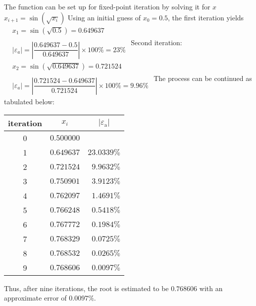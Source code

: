 \documentclass[../main.tex]{subfiles}
\begin{document}
\chapter{}
\label{cha:cha_6}


\section{}


The function can be set up for fixed-point iteration by solving it for $x$
\bigbreak
$x_{i+1}=\sin \left(\sqrt{x_{i}}\right)$
\bigbreak
Using an initial guess of $x_{0}=0.5$, the first iteration yields
\bigbreak
$
\begin{aligned}
&x_{1}=\sin (\sqrt{0.5})=0.649637 \\\\
&\left|\varepsilon_{a}\right|=\left|\dfrac{0.649637-0.5}{0.649637}\right| \times 100 \%=23 \%
\end{aligned}
$
\bigbreak
Second iteration:
\bigbreak
$
\begin{aligned}
&x_{2}=\sin (\sqrt{0.649637})=0.721524 \\\\
&\left|\varepsilon_{a}\right|=\left|\dfrac{0.721524-0.649637}{0.721524}\right| \times 100 \%=9.96 \%
\end{aligned}
$
\bigbreak
The process can be continued as tabulated below:
\bigbreak
\begin{tabular}{crr}
\hline
iteration & \multicolumn{1}{c}{$x_{i}$} & \multicolumn{1}{c}{$\left|\varepsilon_{\mathrm{a}}\right|$} \\
\hline
0 & $0.500000$ &  \\
1 & $0.649637$ & $23.0339 \%$ \\
2 & $0.721524$ & $9.9632 \%$ \\
3 & $0.750901$ & $3.9123 \%$ \\
4 & $0.762097$ & $1.4691 \%$ \\
5 & $0.766248$ & $0.5418 \%$ \\
6 & $0.767772$ & $0.1984 \%$ \\
7 & $0.768329$ & $0.0725 \%$ \\
8 & $0.768532$ & $0.0265 \%$ \\
9 & $0.768606$ & $0.0097 \%$ \\
\hline
\end{tabular}
\bigbreak
Thus, after nine iterations, the root is estimated to be $0.768606$ with an approximate error of $0.0097 \%$.
\bigbreak
\end{document}
